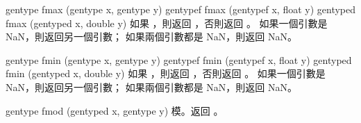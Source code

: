 gentype fmax (gentype x, gentype y)
gentypef fmax (gentypef x, float y)
gentyped fmax (gentyped x, double y)
\stopbuffer
{}
如果 ，則返回 ，否則返回 。
如果一個引數是 NaN，則返回另一個引數；
如果兩個引數都是 NaN，則返回 NaN。
\stopbuffer
\stopbuffer

gentype fmin (gentype x, gentype y)
gentypef fmin (gentypef x, float y)
gentyped fmin (gentyped x, double y)
\stopbuffer
{}
如果 ，則返回 ，否則返回 。
如果一個引數是 NaN，則返回另一個引數；
如果兩個引數都是 NaN，則返回 NaN。
\stopbuffer

gentype fmod (gentyped x, gentype y)
\stopbuffer
{}
模。返回 。
\stopbuffer



\startCLFD


\stopCLFD

